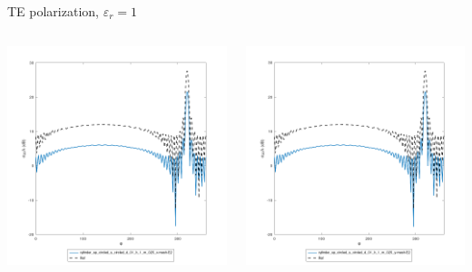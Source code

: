 
\begin{frame}{TE polarization, $\varepsilon_r=1$}

\begin{columns}

\includegraphics[width=\linewidth]{results/FF/cylD_01_H_1_M_025_X/epr1_TE.png}


\includegraphics[width=\linewidth]{results/FF/cylD_01_H_1_M_025_Y/epr1_TE.png}


\end{columns}
\end{frame}
